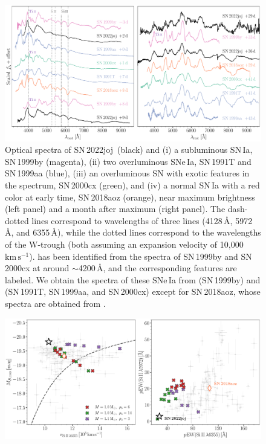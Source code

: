 \documentclass[twocolumn]{aastex631}
\newcommand{\sn}{SN\,2022joj}
\newcommand{\kms}{$\mathrm{km}\,\mathrm{s}^{-1}$}
\begin{document}
\begin{CJK*}{UTF8}{gbsn}
\begin{figure}
    \centering
    \includegraphics[width=\linewidth]{spec_comp.pdf}
    \caption{Optical spectra of \sn\ (black) and (i) a subluminous SN\,Ia, SN\,1999by (magenta), (ii) two overluminous SNe\,Ia, SN\,1991T and SN\,1999aa (blue), (iii) an overluminous SN with exotic  features in the spectrum, SN\,2000cx (green), and (iv) a normal SN\,Ia with a red color at early time, SN\,2018aoz (orange), near maximum brightness (left panel) and a month after maximum (right panel). The dash-dotted lines correspond to wavelengths of three  lines (4128\,\r{A}, 5972\,\r{A}, and 6355\,\r{A}), while the dotted lines correspond to the wavelengths of the  W-trough (both assuming an expansion velocity of 10,000\,\kms).  has been identified from the spectra of SN\,1999by and SN\,2000cx at around $\sim$4200\,\r{A}, and the corresponding features are labeled. We obtain the spectra of these SNe\,Ia from \citet{Matheson_cfaIa_2008} (SN\,1999by) and \citet{Silverman_UCBIa_2012} (SN\,1991T, SN\,1999aa, and SN\,2000cx) except for SN\,2018aoz, whose spectra are obtained from \citet{Ni_18aoz_2023}.}
    \label{fig:spec_comp}
\end{figure}
\begin{figure}
    \centering
    \includegraphics[width=\linewidth]{phase_space.pdf}

\end{figure}
\end{CJK*}
\end{document}
